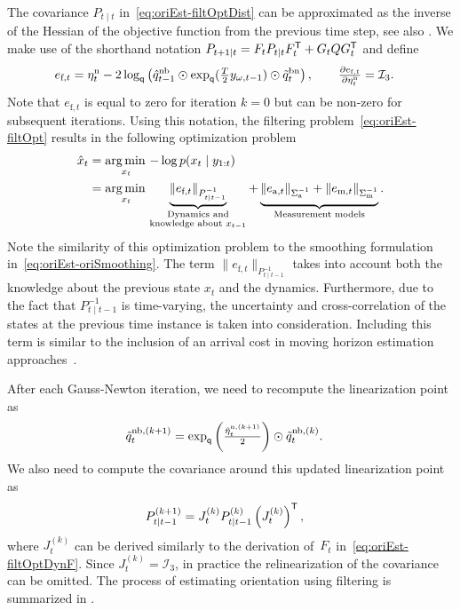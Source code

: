 The covariance $P_{t \mid t}$ in~\eqref{eq:oriEst-filtOptDist} can be approximated as the inverse of the Hessian of the objective function from the previous time step, see also . We make use of the shorthand notation $P_{t+1 \mid t} = F_{t} P_{t \mid t} F_{t}^{\mathsf{T}} + G_{t} Q G_{t}^{\mathsf{T}}$ and define
\begin{align}
\label{eq:oriEst-costDerFiltMarg}
e_{\text{f},t} = \eta^\text{n}_{t}- 2 \log_\mathsf{q} \left(\hat{q}_{t-1}^\text{nb} \odot \exp_\mathsf{q} (\tfrac{T}{2} y_{\omega,t-1} ) \odot  \tilde{q}_{t}^\text{bn} \right), 
\qquad \tfrac{\partial e_{\text{f},t}}{\partial \eta^\text{n}_{t}} &= \mathcal{I}_3.
\end{align}
Note that $e_{\text{f},t}$ is equal to zero for iteration $k = 0$ but can be non-zero for subsequent iterations. Using this notation, the filtering problem~\eqref{eq:oriEst-filtOpt} results in the following optimization problem
\begin{align}
\label{eq:oriEst-filtOptNLS}
\hat{x}_t &= \argmin_{x_{t}} - \log p(x_{t} \mid y_{1:t}) \nonumber \\
&= \argmin_{x_{t}} \underbrace{\| e_{\text{f},t} \|_{P_{t \mid t-1}^{-1}}}_{\begin{subarray}{c}\text{Dynamics and}\\
    \text{knowledge about $x_{t-1}$}\end{subarray}} + \underbrace{\vphantom{\| e_{\text{f},t} \|_{P_{t \mid t-1}^{-1}}} \| e_{\text{a},t} \|_{\Sigma_\text{a}^{-1}} + \| e_{\text{m},t} \|_{\Sigma_\text{m}^{-1}}}_{\text{Measurement models}}.
\end{align}
Note the similarity of this optimization problem to the smoothing formulation in~\eqref{eq:oriEst-oriSmoothing}. The term $\| e_{\text{f},t} \|_{P_{t \mid t-1}^{-1}}$ takes into account both the knowledge about the previous state $x_t$ and the dynamics. Furthermore, due to the fact that $P_{t \mid t-1}^{-1}$ is time-varying, the uncertainty and cross-correlation of the states at the previous time instance is taken into consideration. Including this term is similar to the inclusion of an arrival cost in moving horizon estimation approaches~\citep{raoRM:2003}.

After each Gauss-Newton iteration, we need to recompute the linearization point as
\begin{align}
\label{eq:oriEst-filtOptRelinCov}
\tilde{q}_{t}^{\text{nb},(k+1)} &= \exp_\mathsf{q} \left( \tfrac{\hat{\eta}_t^{\text{n},(k+1)}}{2} \right) \odot \tilde{q}_{t}^{\text{nb},(k)}.
\end{align}
We also need to compute the covariance around this updated linearization point as
\begin{align}
P_{t \mid t-1}^{(k+1)} &= J_{t}^{(k)} P_{t \mid t-1}^{(k)} \left( J_{t}^{(k)} \right)^{\mathsf{T}},
\end{align}
where $J_t^{(k)}$ can be derived similarly to the derivation of~$F_t$ in~\eqref{eq:oriEst-filtOptDynF}. Since $J_t^{(k)} = \mathcal{I}_3$, in practice the relinearization of the covariance can be omitted. The process of estimating orientation using filtering is summarized in .

